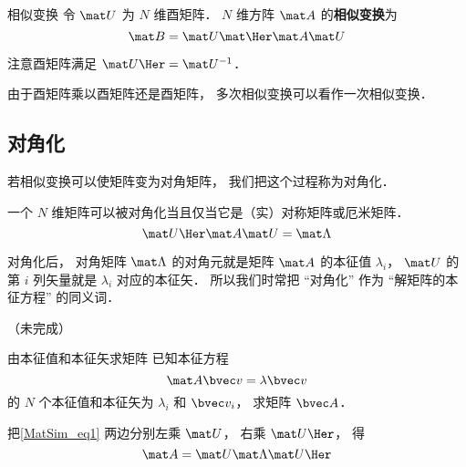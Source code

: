 

\begin{definition}{相似变换}
令 $\mat U$ 为 $N$ 维酉矩阵． $N$ 维方阵 $\mat A$ 的\textbf{相似变换}为
\begin{equation}
\mat B = \mat U \mat\Her \mat A \mat U
\end{equation}
\end{definition}

注意酉矩阵满足 $\mat U\Her = \mat U^{-1}$．

由于酉矩阵乘以酉矩阵还是酉矩阵， 多次相似变换可以看作一次相似变换．

\subsection{对角化}
若相似变换可以使矩阵变为对角矩阵， 我们把这个过程称为对角化．

一个 $N$ 维矩阵可以被对角化当且仅当它是（实）对称矩阵或厄米矩阵．
\begin{equation}\label{MatSim_eq1}
\mat U\Her \mat A \mat U = \mat \Lambda
\end{equation}

对角化后， 对角矩阵 $\mat \Lambda$ 的对角元就是矩阵 $\mat A$ 的本征值 $\lambda_i$， $\mat U$ 的第 $i$ 列矢量就是 $\lambda_i$ 对应的本征矢． 所以我们时常把 “对角化” 作为 “解矩阵的本征方程” 的同义词．

（未完成）

\begin{example}{由本征值和本征矢求矩阵}
已知本征方程
\begin{equation}
\mat A \bvec v = \lambda \bvec v
\end{equation}
的 $N$ 个本征值和本征矢为 $\lambda_i$ 和 $\bvec v_i$， 求矩阵 $\bvec A$．

把\autoref{MatSim_eq1} 两边分别左乘 $\mat U$， 右乘 $\mat U\Her$， 得
\begin{equation}
\mat A = \mat U \mat \Lambda \mat U\Her
\end{equation}
\end{example}
